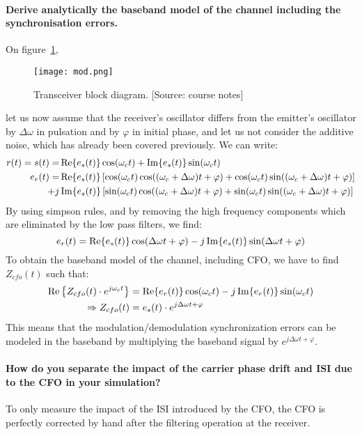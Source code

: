 \paragraph{Derive analytically the baseband model of the channel including the synchronisation errors.}
On figure~\ref{fig:mod},
\begin{figure}
  \centering
  \texttt{[image: mod.png]}
  \caption[Transceiver block diagram.]{Transceiver block diagram. [Source: course notes]\label{fig:mod}}
\end{figure}
let us now assume that the receiver's oscillator differs from the emitter's oscillator by $\Delta \omega$ in pulsation and by $\varphi$ in initial phase, and let us not consider the additive noise, which has already been covered previously.
We can write:
\begin{align*}
  r(t) = s(t) = &\operatorname{Re} \{e_s(t)\} \cos(\omega_c t) + \operatorname{Im} \{e_s(t)\} \sin ( \omega_c t)\\
  e_r(t) = &\operatorname{Re} \{e_s(t)\} \left [ \cos(\omega_c t)\cos((\omega_c + \Delta\omega) t + \varphi) + \cos(\omega_c t)\sin((\omega_c + \Delta\omega) t + \varphi) \right ] \\
  +j &\operatorname{Im} \{e_s(t)\} \left [ \sin(\omega_c t)\cos((\omega_c + \Delta\omega) t + \varphi) + \sin(\omega_c t)\sin((\omega_c + \Delta\omega) t + \varphi) \right ]
\end{align*}
By using simpson rules, and by removing the high frequency components which are eliminated by the low pass filters, we find:
\[
e_r(t) = \operatorname{Re}\{e_s(t)\} \cos(\Delta \omega t + \varphi) - j\operatorname{Im}\{e_s(t)\} \sin(\Delta \omega t + \varphi)
\]
To obtain the baseband model of the channel, including CFO, we have to find $Z_{cfo}(t)$ such that:
\begin{align*}
  \operatorname{Re} \left \{Z_{cfo}(t)\cdot e^{j\omega_c t} \right \} &= \operatorname{Re}\{e_r(t)\} \cos(\omega_c t) - j \operatorname{Im} \{ e_r(t) \} \sin(\omega_c t)\\
  \Rightarrow Z_{cfo}(t) &= e_s(t)\cdot e^{j\Delta \omega t + \varphi}
\end{align*}
This means that the modulation/demodulation synchronization errors can be modeled in the baseband by multiplying the baseband signal by $e^{j\Delta \omega t + \varphi}$.

\paragraph{How do you separate the impact of the carrier phase drift and ISI due to the CFO in your simulation?}
To only measure the impact of the ISI introduced by the CFO, the CFO is perfectly corrected by hand after the filtering operation at the receiver.

